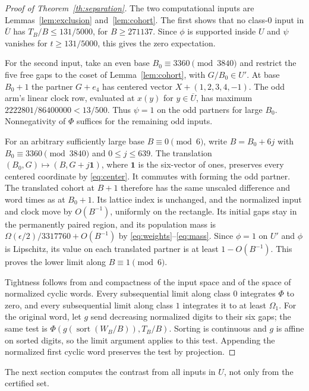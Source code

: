 \documentclass[11pt,reqno]{amsart}
\theoremstyle{remark}
\newcommand{\one}{\boldsymbol 1}
\newcommand{\sort}{\operatorname{sort}}
\begin{document}
\begin{proof}[Proof of Theorem~\ref{th:separation}]
The two computational inputs are Lemmas~\ref{lem:exclusion} and~\ref{lem:cohort}. The first shows that no class-\(0\) input in \(\overline U\) has \(T_B/B\le131/5000\), for \(B\ge271137\). Since \(\phi\) is supported inside \(U\) and \(\psi\) vanishes for \(t\ge131/5000\), this gives the zero expectation.

For the second input, take an even base \(B_0\equiv3360\pmod{3840}\) and restrict the five free gaps to the coset of Lemma~\ref{lem:cohort}, with \(G/B_0\in U'\). At base \(B_0+1\) the partner \(G+e_4\) has centered vector \(X+(1,2,3,4,-1)\). The odd arm's linear clock row, evaluated at \(x(y)\) for \(y\in\overline U\), has maximum \(2222801/86400000<13/500\). Thus \(\psi=1\) on the odd partners for large \(B_0\). Nonnegativity of \(\Phi\) suffices for the remaining odd inputs.

For an arbitrary sufficiently large base \(B\equiv0\pmod6\), write \(B=B_0+6j\) with \(B_0\equiv3360\pmod{3840}\) and \(0\le j\le639\). The translation \((B_0,G)\mapsto (B,G+j\one)\), where \(\one\) is the six-vector of ones, preserves every centered coordinate by \eqref{eq:center}. It commutes with forming the odd partner. The translated cohort at \(B+1\) therefore has the same unscaled difference and word times as at \(B_0+1\). Its lattice index is unchanged, and the normalized input and clock move by \(O(B^{-1})\), uniformly on the rectangle. Its initial gaps stay in the permanently paired region, and its population mass is \(\Omega(\epsilon/2)/3317760+O(B^{-1})\) by \eqref{eq:weights}--\eqref{eq:mass}. Since \(\phi=1\) on \(U'\) and \(\phi\) is Lipschitz, its value on each translated partner is at least \(1-O(B^{-1})\). This proves the lower limit along \(B\equiv1\pmod 6\).

Tightness follows from \cite[Theorem~1]{G6} and compactness of the input space and of the space of normalized cyclic words. Every subsequential limit along class \(0\) integrates \(\Phi\) to zero, and every subsequential limit along class \(1\) integrates it to at least \(\Omega_1\). For the original word, let \(g\) send decreasing normalized digits to their six gaps; the same test is \(\Phi(g(\sort(W_B/B)),T_B/B)\). Sorting is continuous and \(g\) is affine on sorted digits, so the limit argument applies to this test. Appending the normalized first cyclic word preserves the test by projection.
\end{proof}

The next section computes the contrast from all inputs in \(U\), not only from the certified set.
\end{document}
